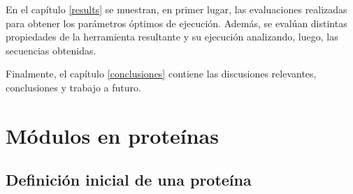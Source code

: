 En el capítulo \ref{results} se muestran, en primer lugar, las evaluaciones realizadas para obtener los parámetros óptimos de ejecución. 
Además, se evalúan distintas propiedades de la herramienta resultante y su ejecución analizando, luego, las secuencias obtenidas. 

Finalmente, el capítulo \ref{conclusiones} contiene las discusiones relevantes, conclusiones y trabajo a futuro.






\section{Módulos en proteínas}
\label{proteinLandscape}
% 

\subsection{Definición inicial de una proteína}


